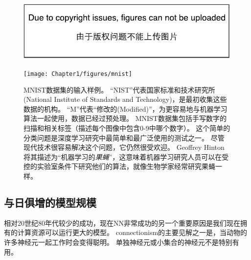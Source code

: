 \begin{figure}[!htb]
\ifOpenSource
\centerline{\includegraphics{figure.pdf}}
\else
\centerline{\texttt{[image: Chapter1/figures/mnist]}}
\fi
\caption{MNIST数据集的输入样例。
``NIST''代表国家标准和技术研究所(National Institute of Standards and Technology)，是最初收集这些数据的机构。
``M''代表``修改的(Modified)''，为更容易地与机器学习算法一起使用，数据已经过预处理。
MNIST数据集包括手写数字的扫描和相关标签（描述每个图像中包含0-9中哪个数字）。
这个简单的分类问题是深度学习研究中最简单和最广泛使用的测试之一。
尽管现代技术很容易解决这个问题，它仍然很受欢迎。
Geoffrey Hinton将其描述为``机器学习的\emph{果蝇}''，这意味着机器学习研究人员可以在受控的实验室条件下研究他们的算法，就像生物学家经常研究果蝇一样。
}
\label{fig:chap1_mnist}
\end{figure}


\subsection{与日俱增的模型规模}
\label{sec:increasing_model_sizes}

相对20世纪80年代较少的成功，现在\gls{NN}非常成功的另一个重要原因是我们现在拥有的计算资源可以运行更大的模型。
\gls{connectionism}的主要见解之一是，当动物的许多神经元一起工作时会变得聪明。
单独神经元或小集合的神经元不是特别有用。

